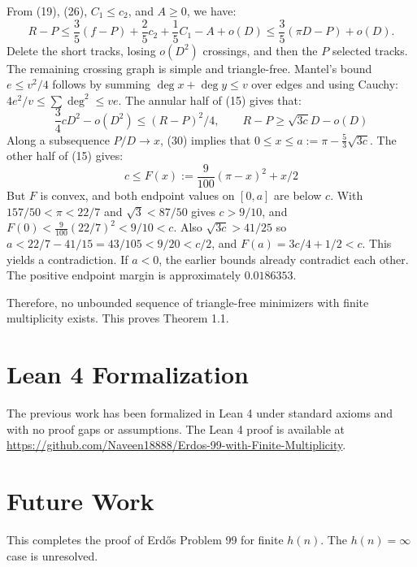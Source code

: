\documentclass[10pt,reqno]{amsart}
\begin{document}
From (19), (26), $C_1 \le c_2$, and $A \ge 0$, we have:
\begin{equation}
    R - P \le \frac{3}{5} (f - P) + \frac{2}{5}c_2 + \frac{1}{5}C_1 - A + o(D) \le \frac{3}{5} (\pi D - P) + o(D).
\end{equation}
Delete the short tracks, losing $o(D^2)$ crossings, and then the $P$ selected tracks. The remaining crossing graph is simple and triangle-free. Mantel's bound $e \le v^2 / 4$ follows by summing $\deg x + \deg y \le v$ over edges and using Cauchy: $4e^2 / v \le \sum \deg^2 \le ve$. The annular half of (15) gives that:
\begin{equation}
    \frac{3}{4} cD^2 - o(D^2) \le (R - P)^2 / 4, \qquad R - P \ge \sqrt{3c} D - o(D)
\end{equation}
Along a subsequence $P / D \to x$, (30) implies that $0 \le x \le a := \pi - \frac{5}{3} \sqrt{3c}$. The other half of (15) gives:
\begin{equation}
    c \le F(x) := \frac{9}{100} (\pi - x)^2 + x / 2
\end{equation}
But $F$ is convex, and both endpoint values on $[0, a]$ are below $c$. With $157 / 50 < \pi < 22 / 7$ and $\sqrt{3} < 87/50$ gives $c > 9 / 10$, and $F(0) < \frac{9}{100}(22 / 7)^2 < 9 / 10 < c$. Also $\sqrt{3c} > 41 / 25$ so $a < 22 / 7 - 41 / 15 = 43 / 105 < 9 /20 < c / 2$, and $F(a) = 3c / 4 + 1 / 2 < c$. This yields a contradiction. If $a < 0$, the earlier bounds already contradict each other. The positive endpoint margin is approximately $0.0186353$.

Therefore, no unbounded sequence of triangle-free minimizers with finite multiplicity exists. This proves Theorem 1.1.



\section{Lean 4 Formalization}

The previous work has been formalized in Lean 4 under standard axioms and with no proof gaps or assumptions. The Lean 4 proof is available at \url{https://github.com/Naveen18888/Erdos-99-with-Finite-Multiplicity}.


\section{Future Work}

This completes the proof of Erd\H{o}s Problem 99 for finite $h(n)$. The $h(n) = \infty$ case is unresolved.
\end{document}
